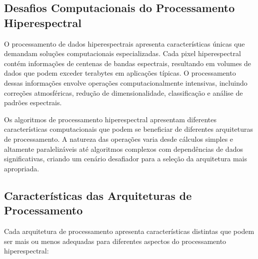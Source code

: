 \subsection{Desafios Computacionais do Processamento Hiperespectral}
O processamento de dados hiperespectrais apresenta características únicas que demandam soluções computacionais especializadas. Cada pixel hiperespectral contém informações de centenas de bandas espectrais, resultando em volumes de dados que podem exceder terabytes em aplicações típicas. O processamento dessas informações envolve operações computacionalmente intensivas, incluindo correções atmosféricas, redução de dimensionalidade, classificação e análise de padrões espectrais.

Os algoritmos de processamento hiperespectral apresentam diferentes características computacionais que podem se beneficiar de diferentes arquiteturas de processamento. A natureza das operações varia desde cálculos simples e altamente paralelizáveis até algoritmos complexos com dependências de dados significativas, criando um cenário desafiador para a seleção da arquitetura mais apropriada.

\subsection{Características das Arquiteturas de Processamento}
Cada arquitetura de processamento apresenta características distintas que podem ser mais ou menos adequadas para diferentes aspectos do processamento hiperespectral:


